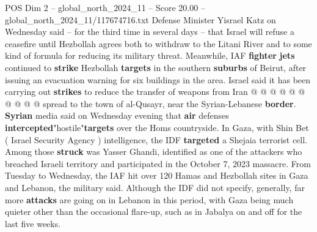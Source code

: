 \begin{textsample}{POS Dim 2 – global\_north\_2024\_11 – Score 20.00 – global\_north\_2024\_11/117674716.txt}
Defense Minister Yisrael Katz on Wednesday said -- for the third time in several days -- that Israel will refuse a ceasefire until Hezbollah agrees both to withdraw to the Litani River and to some kind of formula for reducing its military threat.
Meanwhile, IAF \textbf{fighter} \textbf{jets} continued to \textbf{strike} Hezbollah \textbf{targets} in the southern \textbf{suburbs} of Beirut, after issuing an evacuation warning for six buildings in the area.
Israel said it has been carrying out \textbf{strikes} to reduce the transfer of weapons from Iran @ @ @ @ @ @ @ @ @ @ spread to the town of al-Qusayr, near the Syrian-Lebanese \textbf{border}. \textbf{Syrian} media said on Wednesday evening that \textbf{air} defenses \textbf{intercepted}"hostile"\textbf{targets} over the Homs countryside.
In Gaza, with Shin Bet ( Israel Security Agency ) intelligence, the IDF \textbf{targeted} a Shejaia terrorist cell.
Among those \textbf{struck} was Yasser Ghandi, identified as one of the attackers who breached Israeli territory and participated in the October 7, 2023 massacre.
From Tuesday to Wednesday, the IAF hit over 120 Hamas and Hezbollah sites in Gaza and Lebanon, the military said.
Although the IDF did not specify, generally, far more \textbf{attacks} are going on in Lebanon in this period, with Gaza being much quieter other than the occasional flare-up, such as in Jabalya on and off for the last five weeks.

\end{textsample}
